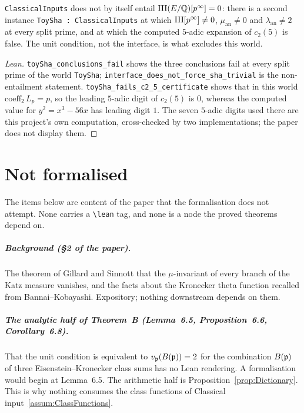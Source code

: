 \begin{theorem}
  \label{thm:AssumptionsDoNotForceShaZero}
  \leanok
  \texttt{ClassicalInputs} does not by itself entail
  $\mathrm{III}(E/\mathbb{Q})[p^\infty] = 0$: there is a second instance
  \texttt{ToySha : ClassicalInputs} at which $\mathrm{III}[p^\infty] \ne 0$,
  $\mu_{\mathrm{an}} \ne 0$ and $\lambda_{\mathrm{an}} \ne 2$ at every split
  prime, and at which the computed $5$-adic expansion of $c_2(5)$ is false.
  The unit condition, not the interface, is what excludes this world.
\end{theorem}
\begin{proof}[Lean]
  \leanok
  \texttt{toySha\_conclusions\_fail} shows the three conclusions fail at
  every split prime of the world \texttt{ToySha};
  \texttt{interface\_does\_not\_force\_sha\_trivial} is the non-entailment
  statement. \texttt{toySha\_fails\_c2\_5\_certificate} shows that in this
  world $\mathrm{coeff}_2\, L_p = p$, so the leading $5$-adic digit of
  $c_2(5)$ is $0$, whereas the computed value for $y^2 = x^3 - 56x$ has
  leading digit $1$. The seven $5$-adic digits used there are this project's
  own computation, cross-checked by two implementations; the paper does not
  display them.
\end{proof}

\chapter{Not formalised}
\label{ch:descoped}

The items below are content of the paper that the formalisation does not
attempt. None carries a \texttt{\textbackslash lean} tag, and none is a node
the proved theorems depend on.

\paragraph{Background (\S 2 of the paper).} The theorem of Gillard and
Sinnott that the $\mu$-invariant of every branch of the Katz measure
vanishes, and the facts about the Kronecker theta function recalled from
Bannai--Kobayashi. Expository; nothing downstream depends on them.

\paragraph{The analytic half of Theorem~B (Lemma~6.5, Proposition~6.6,
Corollary~6.8).} That the unit condition is equivalent to
$v_{\mathfrak{p}}(B({\mathfrak{p}})) = 2$ for the combination $B({\mathfrak{p}})$ of three
Eisenstein--Kronecker class sums has no Lean rendering. A formalisation
would begin at Lemma~6.5. The arithmetic half is
Proposition~\ref{prop:Dictionary}. This is why nothing consumes the class
functions of Classical input~\ref{assum:ClassFunctions}.

